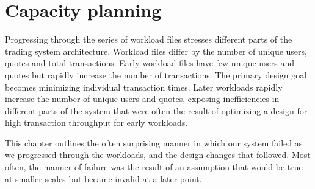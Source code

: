 \chapter{Capacity planning}\label{ch:cap}
Progressing through the series of workload files stresses different parts of the trading system architecture.
Workload files differ by the number of unique users, quotes and total transactions.
Early workload files have few unique users and quotes but rapidly increase the number of transactions.
The primary design goal becomes minimizing individual transaction times.
Later workloads rapidly increase the number of unique users and quotes, exposing inefficiencies in different parts of the system that were often the result of optimizing a design for high transaction throughput for early workloads.

This chapter outlines the often surprising manner in which our system failed as we progressed through the workloads, and the design changes that followed.
Most often, the manner of failure was the result of an assumption that would be true at smaller scales but became invalid at a later point.
